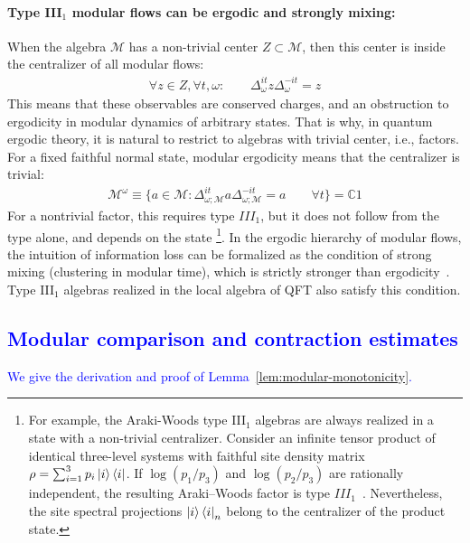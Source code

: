 \documentclass[a4paper,11pt]{article}
\theoremstyle{definition}
\newcommand{\mM}{\mathcal{M}}
\newcommand{\NL}[1]{\textcolor{blue}{#1}}
\begin{document}
\paragraph{Type III$_1$ modular flows can be ergodic and strongly mixing:}

When the algebra $\mM$ has a non-trivial center $Z\subset \mM$, then this center is inside the centralizer of all modular flows:
\begin{align}
    \forall z\in Z,\forall t,\omega:\qquad \Delta_{\omega}^{it}z \Delta_\omega^{-it}=z
\end{align}
This means that these observables are conserved charges, and an obstruction to ergodicity in modular dynamics of arbitrary states. That is why, in quantum ergodic theory, it is natural to restrict to algebras with trivial center, i.e., factors. For a fixed faithful normal state, modular ergodicity means that the centralizer is trivial:
\begin{align}
    \label{eq:modular-ergodicity}
    \mM^\omega\equiv \{a\in \mM:\Delta_{\omega;\mM}^{it}a\Delta_{\omega;\mM}^{-it}=a\qquad \forall t\}=\mathbb{C} 1
\end{align}
For a nontrivial factor, this requires type $III_1$, but it does not follow from the
type alone, and depends on the state \footnote{For example, the Araki-Woods type III$_1$ algebras are always realized in a state with a non-trivial centralizer. Consider an infinite tensor product of identical three-level
systems with faithful site density matrix
$\rho=\sum_{i=1}^3p_i\ket{i}\bra{i}$.
If $\log(p_1/p_3)$ and $\log(p_2/p_3)$ are rationally independent, the resulting
Araki--Woods factor is type $III_1$~\cite{ArakiWoods1968}.
Nevertheless, the site spectral projections $\ket{i}\bra{i}_n$ belong to the
centralizer of the product state.}. In the ergodic hierarchy of modular flows, the intuition of information loss can be formalized as the condition of strong mixing (clustering in modular time), which is strictly stronger than ergodicity~\cite{furuya2023information}. Type III$_1$ algebras realized in the local algebra of QFT also satisfy this condition.

\subsection{\NL{Modular comparison and contraction estimates}}
\label{app:modular-comparison}

\NL{We give the derivation and proof of Lemma~\ref{lem:modular-monotonicity}.}
\end{document}
